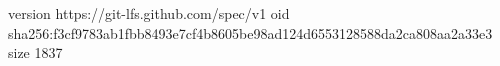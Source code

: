 version https://git-lfs.github.com/spec/v1
oid sha256:f3cf9783ab1fbb8493e7cf4b8605be98ad124d6553128588da2ca808aa2a33e3
size 1837
